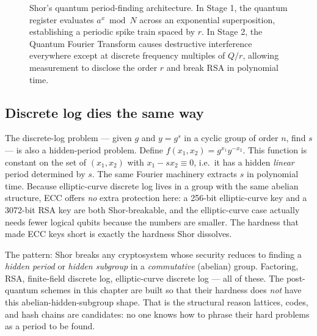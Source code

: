 \begin{figure}[H]
\caption{Shor's quantum period-finding architecture. In Stage 1, the quantum register evaluates $a^x \bmod N$ across an exponential superposition, establishing a periodic spike train spaced by $r$. In Stage 2, the Quantum Fourier Transform causes destructive interference everywhere except at discrete frequency multiples of $Q/r$, allowing measurement to disclose the order $r$ and break RSA in polynomial time.}
\label{ch35:fig-shor-qft}
\end{figure}

\subsection{Discrete log dies the same way}
\label{ch35:shor-dlog}

The discrete-log problem --- given $g$ and $y=g^s$ in a cyclic group of order $n$, find $s$ --- is also a hidden-period problem. Define $f(x_1,x_2)=g^{x_1} y^{-x_2}$. This function is constant on the set of $(x_1,x_2)$ with $x_1 - s x_2 \equiv 0$, i.e.\ it has a hidden \emph{linear} period determined by $s$. The same Fourier machinery extracts $s$ in polynomial time. Because elliptic-curve discrete log lives in a group with the same abelian structure, ECC offers \emph{no} extra protection here: a 256-bit elliptic-curve key and a 3072-bit RSA key are both Shor-breakable, and the elliptic-curve case actually needs fewer logical qubits because the numbers are smaller. The hardness that made ECC keys short is exactly the hardness Shor dissolves.

\begin{focusbox}
The pattern: Shor breaks any cryptosystem whose security reduces to finding a \emph{hidden period} or \emph{hidden subgroup} in a \emph{commutative} (abelian) group. Factoring, RSA, finite-field discrete log, elliptic-curve discrete log --- all of these. The post-quantum schemes in this chapter are built so that their hardness does \emph{not} have this abelian-hidden-subgroup shape. That is the structural reason lattices, codes, and hash chains are candidates: no one knows how to phrase their hard problems as a period to be found.
\end{focusbox}

